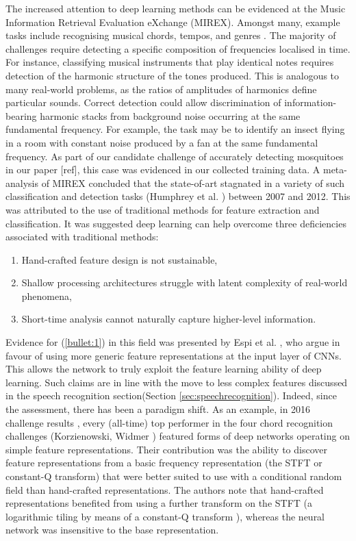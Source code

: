 \documentclass[12pt]{llncs}
\newcommand{\ikN}[1]{\todo[inline, size=\small, color=orange!30]{[ik] #1}}
\begin{document}
The increased attention to deep learning methods can be evidenced at the Music Information Retrieval Evaluation eXchange (MIREX). Amongst many, example tasks include recognising musical chords, tempos, and genres \cite{mirex2016}. The majority of challenges require detecting a specific composition of frequencies localised in time. For instance, classifying musical instruments that play identical notes requires detection of the harmonic structure of the tones produced. This is analogous to many real-world problems, as the ratios of amplitudes of harmonics define particular sounds. Correct detection could allow discrimination of information-bearing harmonic stacks from background noise occurring at the same fundamental frequency. For example, the task may be to identify an insect flying in a room with constant noise produced by a fan at the same fundamental frequency. As part of our candidate challenge of accurately detecting mosquitoes in our paper [ref], this case was evidenced in our collected training data.\ikN{Making specific reference to mosquito detection but nowhere else?}
A meta-analysis of MIREX concluded that the state-of-art stagnated in a variety of such classification and detection tasks (Humphrey et al. \cite{humphrey2013feature}) between 2007 and 2012. 
This was attributed to the use of traditional methods for feature extraction and classification. It was suggested deep learning can help overcome three deficiencies associated with traditional methods: 
\begin{enumerate}
    \item Hand-crafted feature design is not sustainable,
    \label{bullet:1}
    \item Shallow processing architectures struggle with latent complexity of real-world phenomena,
    \label{bullet:2}
    \item Short-time analysis cannot naturally capture higher-level information. 
    \label{bullet:3}
\end{enumerate}
Evidence for (\ref{bullet:1}) in this field was presented by Espi et al. \cite{espi2015exploiting}, who argue in favour of using more generic feature representations at the input layer of CNNs. This allows the network to truly exploit the feature learning ability of deep learning. Such claims are in line with the move to less complex features discussed in the speech recognition section(Section \ref{sec:speechrecognition}).
Indeed, since the assessment, there has been a paradigm shift. As an example, in 2016 challenge results \cite{mirex2016}, every (all-time) top performer in the four chord recognition challenges (Korzienowski, Widmer \cite{korzeniowski2016feature,mirex2016chord}) featured forms of deep networks operating on simple feature representations. Their contribution was the ability to discover feature representations from a basic frequency representation (the STFT or constant-Q transform) that were better suited to use with a conditional random field than hand-crafted representations. The authors note that hand-crafted representations benefited from using a further transform on the STFT (a logarithmic tiling by means of a constant-Q transform \cite{brown1991calculation}), whereas the neural network was insensitive to the base representation.
\end{document}
